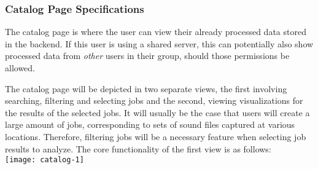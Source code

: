\subsubsection{Catalog Page Specifications}
The catalog page is where the user can view their already processed data stored in the backend. If this user is using a shared server, this can potentially also show processed data from \textit{other} users in their group, should those permissions be allowed.\par
The catalog page will be depicted in two separate views, the first involving searching, filtering and selecting jobs and the second, viewing visualizations for the results of the selected jobs. It will usually be the case that users will create a large amount of jobs, corresponding to sets of sound files captured at various locations. Therefore, filtering jobs will be a necessary feature when selecting job results to analyze. The core functionality of the first view is as follows:\\
\texttt{[image: catalog-1]}

